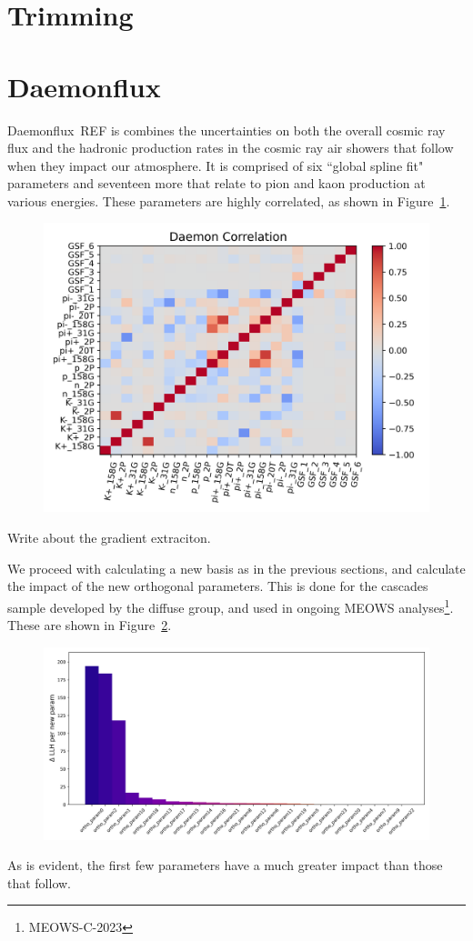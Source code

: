 \documentclass[12pt,a4paper]{article}
\begin{document}
\section{Trimming}

\section{Daemonflux}

Daemonflux~REF is combines the uncertainties on both the overall cosmic ray flux and the hadronic production rates in the cosmic ray air showers that follow when they impact our atmosphere.
It is comprised of six ``global spline fit" parameters and seventeen more that relate to pion and kaon production at various energies. 
These parameters are highly correlated, as shown in Figure~\ref{fig:cov}. 
\begin{figure}\label{fig:cov}
    \centering
    \includegraphics[width=0.75\linewidth]{./figures/daemon_cov.png}
\end{figure}

Write about the gradient extraciton. 

We proceed with calculating a new basis as in the previous sections, and calculate the impact of the new orthogonal parameters.
This is done for the cascades sample developed by the diffuse group, and used in ongoing MEOWS analyses\footnote{MEOWS-C-2023}. 
These are shown in Figure~\ref{fig:impact}.
\begin{figure}\label{fig:impact}
    \centering
    \includegraphics[width=0.75\linewidth]{figures/daemon_distr.png}
\end{figure}
As is evident, the first few parameters have a much greater impact than those that follow.
\end{document}
